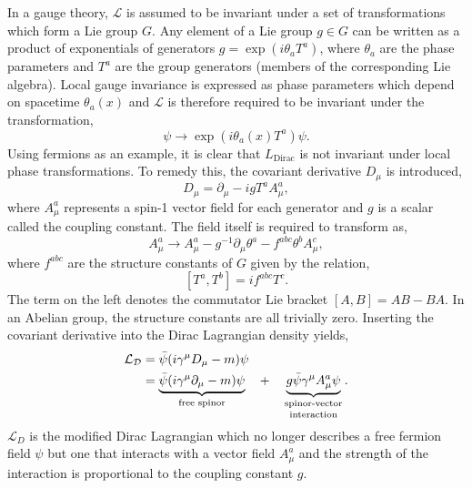 In a gauge theory, $\mathcal{L}$ is assumed to be invariant under a set of transformations which form a Lie group $G$.
Any element of a Lie group $g \in G$ can be written as a product of exponentials of generators $g = \exp(i \theta_a T^a)$, where $\theta_a$ are the phase parameters and $T^a$ are the group generators (members of the corresponding Lie algebra).
Local gauge invariance is expressed as phase parameters which depend on spacetime $\theta_a(x)$ and $\mathcal{L}$ is therefore required to be invariant under the transformation,
\begin{equation}
	\label{eq:local_gauge_invariance}
	\psi \rightarrow \exp\left(i \theta_a(x) T^a\right) \psi.
\end{equation}
Using fermions as an example, it is clear that $L_\text{Dirac}$ is not invariant under local phase transformations.
To remedy this, the covariant derivative $D_\mu$ is introduced,
\begin{equation}
	\label{eq:covariant_derivative}
	D_\mu = \partial_\mu - i g T^a A_\mu^a,
\end{equation}
where $A_\mu^a$ represents a spin-1 vector field for each generator and $g$ is a scalar called the coupling constant.
The field itself is required to transform as,
\begin{equation}
	\label{eq:gauge_transformation}
	A_\mu^a \rightarrow A_\mu^a - g^{-1} \partial_\mu \theta^a - f^{abc} \theta^b A_\mu^c,
\end{equation}
where $f^{abc}$ are the structure constants of $G$ given by the relation,
\begin{equation}
	\label{eq:structure_constants}
	[T^a, T^b] = i f^{abc} T^c.
\end{equation}
The term on the left denotes the commutator Lie bracket $[A, B] = AB - BA$.
In an Abelian group, the structure constants are all trivially zero.
Inserting the covariant derivative into the Dirac Lagrangian density yields,
\begin{align}
	\label{eq:dirac_lagrangian_gauge}
	\mathcal{L_D} & = \bar \psi (i \gamma^\mu D_\mu - m) \psi                                                                                                                                       \\
	              & = \underbrace{\bar \psi (i \gamma^\mu \partial_\mu - m) \psi}_\text{free spinor} \quad + \quad \underbrace{g \bar \psi \gamma^\mu A_\mu^a \psi}_\text{\shortstack{spinor-vector \\interaction}}.
\end{align}
$\mathcal{L}_D$ is the modified Dirac Lagrangian which no longer describes a free fermion field $\psi$ but one that interacts with a vector field $A_\mu^a$ and the strength of the interaction is proportional to the coupling constant $g$.

